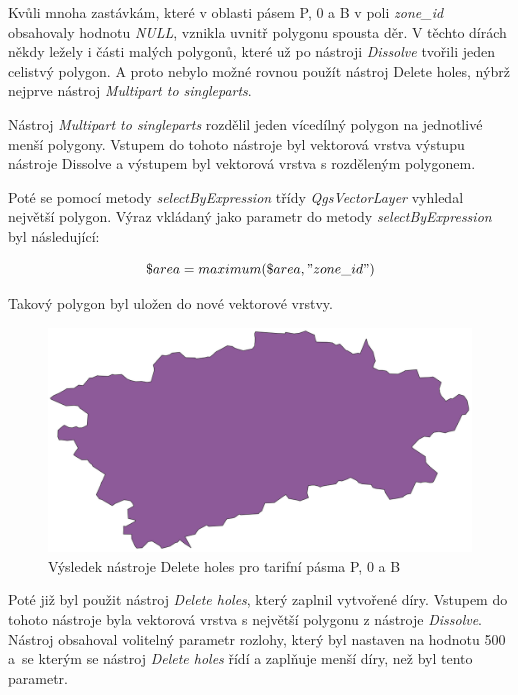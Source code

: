 Kvůli mnoha zastávkám, které v oblasti pásem P, 0 a B v poli \textit{zone\_id} obsahovaly hodnotu \textit{NULL},
vznikla uvnitř polygonu spousta děr. V těchto dírách někdy ležely i části malých polygonů, které 
už po nástroji \textit{Dissolve} tvořili jeden celistvý polygon. A proto nebylo možné rovnou použít nástroj Delete holes,
nýbrž nejprve nástroj \textit{Multipart to singleparts}.

Nástroj \textit{Multipart to singleparts} rozdělil jeden vícedílný polygon na jednotlivé menší polygony. Vstupem do tohoto
nástroje byl vektorová vrstva výstupu nástroje Dissolve a výstupem byl vektorová vrstva s rozděleným polygonem.

Poté se pomocí metody \textit{selectByExpression} třídy \textit{QgsVectorLayer} vyhledal nej\-větší polygon.
Výraz vkládaný jako parametr do metody \textit{selectByExpression} byl následující:

\[\$area = maximum(\$area, "zone\_id")\]

Takový polygon byl uložen do nové vektorové vrstvy. 

\begin{figure}[H] \centering
    \includegraphics[width=400pt]{./pictures/without-holes-P0B.png}
    \caption[Výsledek nástroje Delete holes pro tarifní pásma P, 0 a B]{Výsledek nástroje Delete holes pro tarifní pásma P, 0 a B}
	\label{fig:without-holes-P0B}              
\end{figure} 

Poté již byl použit nástroj \textit{Delete holes}, který zaplnil vytvořené díry. Vstupem do tohoto nástroje byla vektorová
vrstva s největší polygonu z nástroje \textit{Dissolve}. Nástroj obsahoval volitelný parametr rozlohy, který byl
nastaven na hodnotu 500 a~se kterým se nástroj \textit{Delete holes} řídí a zaplňuje menší díry, než byl tento parametr.  

